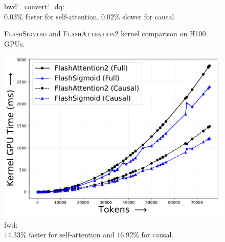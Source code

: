 \begin{figure}[!htbp]
\begin{minipage}{0.24\textwidth}
        \captionsetup{justification=centering} 
        \caption*{
            \textrm{bwd\char`_convert\char`_dq}:\\
            $0.03\%$ faster for self-attention, $0.02\%$ slower for causal. 
        }
    \end{minipage}
    \caption{
        \textsc{FlashSigmoid} and \textsc{FlashAttention2} kernel comparison on H100 GPUs. 
    }
    \label{fig:h100-softmax-sigmoid-kernels}
\end{figure}
\begin{figure}[!htbp]
    \centering
    \begin{minipage}{0.24\textwidth}
        \footnotesize
        \centering
        \includegraphics[trim={0 0 0 0}, width=\textwidth]{figures/_flash_figures/final_arxiv/f2/individual/a100/A100_noalibi_flash_fwd_kernel_Full_14.33_0.05_Causal_16.92_0.09.pdf}
        \captionsetup{justification=centering}
        \caption*{
            fwd:\\$14.33\%$ faster for self-attention and $16.92\%$ for causal. 
        } 
    \end{minipage}
    \hfill
    \begin{minipage}{0.24\textwidth}
        \centering        

\end{minipage}
\end{figure}
